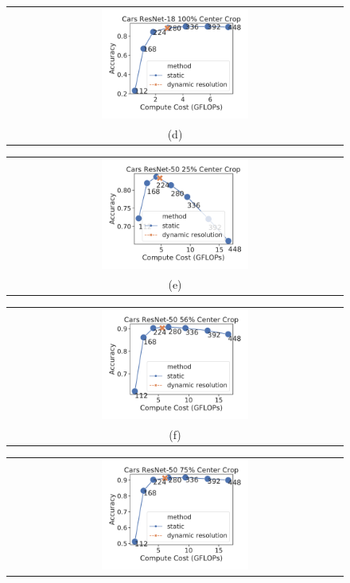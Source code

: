 \begin{figure}[h!]
\begin{tabular}{@{}c@{}}
    \includegraphics[width=0.45\textwidth]{e2e_figures/cars_resnet18_full_center.pdf} \\
    \small (d)
    \end{tabular}
    \begin{tabular}{@{}c@{}}
    \includegraphics[width=0.45\textwidth]{e2e_figures/cars_resnet50_25_center.pdf} \\
    \small (e)
    \end{tabular}
    \begin{tabular}{@{}c@{}}
    \includegraphics[width=0.45\textwidth]{e2e_figures/cars_resnet50_56_center.pdf} \\
    \small (f)
    \end{tabular}
    \begin{tabular}{@{}c@{}}
    \includegraphics[width=0.45\textwidth]{e2e_figures/cars_resnet50_default_center.pdf} \\

\end{tabular}
\end{figure}
